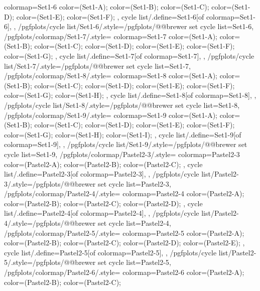 {{    colormap={Set1-6}{
      color=(Set1-A);
      color=(Set1-B);
      color=(Set1-C);
      color=(Set1-D);
      color=(Set1-E);
      color=(Set1-F);
    },
    cycle list/.define={Set1-6}{[of colormap=Set1-6]},
  },
  /pgfplots/cycle list/Set1-6/.style={/pgfplots/@@brewer set cycle list={Set1-6}},
  /pgfplots/colormap/Set1-7/.style={
    colormap={Set1-7}{
      color=(Set1-A);
      color=(Set1-B);
      color=(Set1-C);
      color=(Set1-D);
      color=(Set1-E);
      color=(Set1-F);
      color=(Set1-G);
    },
    cycle list/.define={Set1-7}{[of colormap=Set1-7]},
  },
  /pgfplots/cycle list/Set1-7/.style={/pgfplots/@@brewer set cycle list={Set1-7}},
  /pgfplots/colormap/Set1-8/.style={
    colormap={Set1-8}{
      color=(Set1-A);
      color=(Set1-B);
      color=(Set1-C);
      color=(Set1-D);
      color=(Set1-E);
      color=(Set1-F);
      color=(Set1-G);
      color=(Set1-H);
    },
    cycle list/.define={Set1-8}{[of colormap=Set1-8]},
  },
  /pgfplots/cycle list/Set1-8/.style={/pgfplots/@@brewer set cycle list={Set1-8}},
  /pgfplots/colormap/Set1-9/.style={
    colormap={Set1-9}{
      color=(Set1-A);
      color=(Set1-B);
      color=(Set1-C);
      color=(Set1-D);
      color=(Set1-E);
      color=(Set1-F);
      color=(Set1-G);
      color=(Set1-H);
      color=(Set1-I);
    },
    cycle list/.define={Set1-9}{[of colormap=Set1-9]},
  },
  /pgfplots/cycle list/Set1-9/.style={/pgfplots/@@brewer set cycle list={Set1-9}},
  /pgfplots/colormap/Pastel2-3/.style={
    colormap={Pastel2-3}{
      color=(Pastel2-A);
      color=(Pastel2-B);
      color=(Pastel2-C);
    },
    cycle list/.define={Pastel2-3}{[of colormap=Pastel2-3]},
  },
  /pgfplots/cycle list/Pastel2-3/.style={/pgfplots/@@brewer set cycle list={Pastel2-3}},
  /pgfplots/colormap/Pastel2-4/.style={
    colormap={Pastel2-4}{
      color=(Pastel2-A);
      color=(Pastel2-B);
      color=(Pastel2-C);
      color=(Pastel2-D);
    },
    cycle list/.define={Pastel2-4}{[of colormap=Pastel2-4]},
  },
  /pgfplots/cycle list/Pastel2-4/.style={/pgfplots/@@brewer set cycle list={Pastel2-4}},
  /pgfplots/colormap/Pastel2-5/.style={
    colormap={Pastel2-5}{
      color=(Pastel2-A);
      color=(Pastel2-B);
      color=(Pastel2-C);
      color=(Pastel2-D);
      color=(Pastel2-E);
    },
    cycle list/.define={Pastel2-5}{[of colormap=Pastel2-5]},
  },
  /pgfplots/cycle list/Pastel2-5/.style={/pgfplots/@@brewer set cycle list={Pastel2-5}},
  /pgfplots/colormap/Pastel2-6/.style={
    colormap={Pastel2-6}{
      color=(Pastel2-A);
      color=(Pastel2-B);
      color=(Pastel2-C);
}}}
